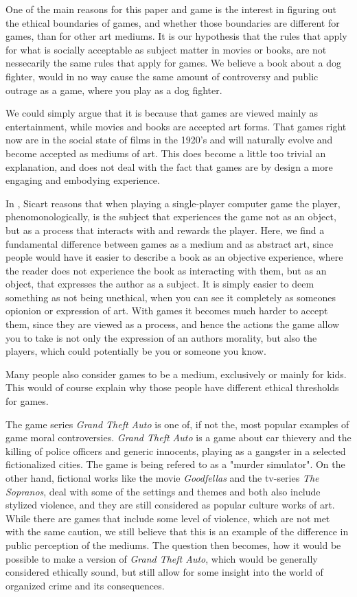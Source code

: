 One of the main reasons for this paper and game is the interest in figuring out the ethical boundaries of games, and whether those boundaries are different for games, than for other art mediums. It is our hypothesis that the rules that apply for what is socially acceptable as subject matter in movies or books, are not nessecarily the same rules that apply for games. We believe a book about a dog fighter, would in no way cause the same amount of controversy and public outrage as a game, where you play as a dog fighter. \

We could simply argue that it is because that games are viewed mainly as entertainment, while movies and books are accepted art forms. That games right now are in the social state of films in the 1920's and will naturally evolve and become accepted as mediums of art. This does become a little too trivial an explanation, and does not deal with the fact that games are by design a more engaging and embodying experience.\

In \citep{sicart2011ethics}, Sicart reasons that when playing a single-player computer game the player, phenomonologically, is the subject that experiences the game not as an object, but as a process that interacts with and rewards the player. Here, we find a fundamental difference between games as a medium and as abstract art, since people would have it easier to describe a book as an objective experience, where the reader does not experience the book as interacting with them, but as an object, that expresses the author as a subject. It is simply easier to deem something as not being unethical, when you can see it completely as someones opionion or expression of art. With games it becomes much harder to accept them, since they are viewed as a process, and hence the actions the game allow you to take is not only the expression of an authors morality, but also the players, which could potentially be you or someone you know. \

Many people also consider games to be a medium, exclusively or mainly for kids. This would of course explain why those people have different ethical thresholds for games. \

The game series \textit{Grand Theft Auto}\citep{north2013grand} is one of, if not the, most popular examples of game moral controversies. \textit{Grand Theft Auto} is a game about car thievery and the killing of police officers and generic innocents, playing as a gangster in a selected fictionalized cities. The game is being refered to as a "murder simulator".\citep{murdersim} On the other hand, fictional works like the movie \textit{Goodfellas} and the tv-series \textit{The Sopranos}, deal with some of the settings and themes and both also include stylized violence, and they are still considered as popular culture works of art.\citep{sicart2011ethics} While there are games that include some level of violence, which are not met with the same caution, we still believe that this is an example of the difference in public perception of the mediums. The question then becomes, how it would be possible to make a version of \textit{Grand Theft Auto}, which would be generally considered ethically sound, but still allow for some insight into the world of organized crime and its consequences.\

